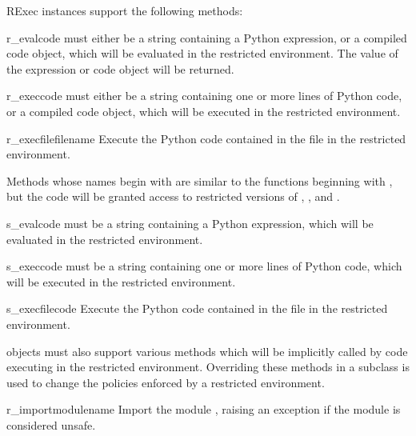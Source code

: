 RExec instances support the following methods:
\renewcommand{\indexsubitem}{(RExec object method)}

\begin{funcdesc}{r_eval}{code}
 must either be a string containing a Python expression, or a compiled code object, which will
be evaluated in the restricted environment.  The value of the expression or code object will be returned.
\end{funcdesc}

\begin{funcdesc}{r_exec}{code}
 must either be a string containing one or more lines of Python code,  or a compiled code object,
which will be executed in the restricted environment.  
\end{funcdesc}

\begin{funcdesc}{r_execfile}{filename}
Execute the Python code contained in the file  in the
restricted environment.
\end{funcdesc}

Methods whose names begin with  are similar to the functions
beginning with , but the code will be granted access to
restricted versions of , , and
.  

\begin{funcdesc}{s_eval}{code}
 must be a string containing a Python expression, which will
be evaluated in the restricted environment.  
\end{funcdesc}

\begin{funcdesc}{s_exec}{code}
 must be a string containing one or more lines of Python code,
which will be executed in the restricted environment.  
\end{funcdesc}

\begin{funcdesc}{s_execfile}{code}
Execute the Python code contained in the file  in the
restricted environment.
\end{funcdesc}

 objects must also support various methods which will be implicitly called 
by code executing in the restricted environment.  Overriding these
methods in a subclass is used to change the policies enforced by a restricted environment.

\begin{funcdesc}{r_import}{modulename}
Import the module , raising an  exception
if the module is considered unsafe.  
\end{funcdesc}


